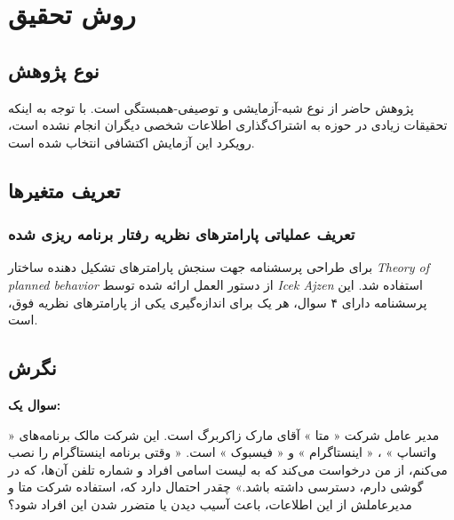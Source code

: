 \chapter{روش تحقیق}
\section{نوع پژوهش}
پژوهش حاضر از نوع شبه-آزمایشی و توصیفی-همبستگی است. با توجه به اینکه تحقیقات زیادی در حوزه به اشتراک‌گذاری اطلاعات شخصی دیگران 
انجام نشده است، رویکرد این آزمایش اکتشافی انتخاب شده است.
\section{تعریف متغیر‌ها}



\subsection{تعریف عملیاتی پارامترهای
     نظریه رفتار برنامه ریزی شده    
}

برای طراحی پرسشنامه جهت سنجش پارامتر‌های تشکیل دهنده ساختار
\textit{\gls{Theory of planned behavior}}
از دستور العمل ارائه شده توسط
\textit{\gls{Icek Ajzen}}
\!\citep{ajzenIcekAjzenHomepage}
استفاده شد. این پرسشنامه دارای ۴ سوال، هر یک برای اندازه‌گیری
یکی از پارامترهای نظریه فوق، است.

\section*{نگرش}

\textbf{سوال یک:}

مدیر عامل شرکت « متا » آقای مارک زاکربرگ است. این شرکت مالک برنامه‌های « واتساپ » ، « اینستاگرام » و « فیسبوک » است.
« وقتی برنامه اینستاگرام را نصب می‌کنم، از من درخواست می‌کند که به لیست اسامی افراد و شماره تلفن‌ آن‌ها، که در گوشی دارم، دسترسی داشته باشد.»
چقدر احتمال دارد که، استفاده شرکت متا و مدیر‌عاملش از این اطلاعات، باعث آسیب‌ دیدن یا متضرر شدن این افراد شود؟ 

